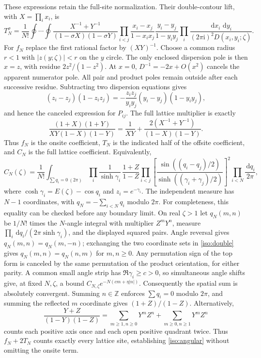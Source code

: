 \documentclass[11pt]{article}
\numberwithin{equation}{section}
\theoremstyle{definition}
\newcommand{\Z}{\mathbb Z}
\newcommand{\ii}{\mathrm i}
\newcommand{\dd}{\,\mathrm d}
\begin{document}
These expressions retain the full-site normalization. Their double-contour
lift, with $X=\prod_i x_i$, is
\begin{equation}
 T_N^\sigma=\frac1{N!}\oint\cdots\oint
 \frac{X^{-1}+Y^{-1}}{(1-\sigma X)(1-\sigma Y)}
 \prod_{i<j}\frac{x_i-x_j}{1-x_ix_j}
             \frac{y_i-y_j}{1-y_iy_j}
 \prod_i\frac{\dd x_i\,\dd y_i}{(2\pi\ii)^2D(x_i,y_i;\zeta)}.
 \label{iso:double}
\end{equation}
For $f_N$ replace the first rational factor by $(XY)^{-1}$. Choose a
common radius $r<1$ with $|z(y;\zeta)|<r$ on the $y$ circle. The only
enclosed dispersion pole is then $x=z$, with residue
$2z^2/(1-z^2)$. At $x=0$, $D^{-1}=-2x+O(x^2)$ cancels the
apparent numerator pole. All pair and product poles remain outside after
each successive residue. Subtracting two dispersion equations gives
\[
 (z_i-z_j)(1-z_i z_j)
 =-\frac{z_i z_j}{y_i y_j}(y_i-y_j)(1-y_i y_j),
\]
and hence the canceled expression for $P_{ij}$. The full lattice
multiplier is exactly
\begin{equation}
 \frac{(1+X)(1+Y)}{XY(1-X)(1-Y)}
 =\frac1{XY}+\frac{2(X^{-1}+Y^{-1})}{(1-X)(1-Y)}.
 \label{iso:sites}
\end{equation}
Thus $f_N$ is the onsite coefficient, $T_N$ is the indicated half of the
offsite coefficient, and $C_N$ is the full lattice coefficient. Equivalently,
\begin{equation}
 C_N(\zeta)=\frac1{N!}\int_{\sum q_i=0\ (2\pi)}
 \prod_i\frac1{\sinh\gamma_i}\,
 \frac{1+Z}{1-Z}
 \prod_{i<j}\left[
 \frac{\sin((q_i-q_j)/2)}{\sinh((\gamma_i+\gamma_j)/2)}
 \right]^2\prod_{i<N}\frac{\dd q_i}{2\pi},
 \label{iso:angular}
\end{equation}
where $\cosh\gamma_i=E(\zeta)-\cos q_i$ and $z_i=e^{-\gamma_i}$.
The independent measure has $N-1$ coordinates, with
$q_N=-\sum_{i<N}q_i$ modulo $2\pi$.
For completeness, this equality can be checked before any boundary limit.
On real $\zeta>1$ let $q_N(m,n)$ be $1/N!$ times the $N$-angle integral with
multiplier $Z^mY^n$, measure
$\prod_i\dd q_i/(2\pi\sinh\gamma_i)$, and the displayed squared pairs.
Angle reversal gives $q_N(m,n)=q_N(m,-n)$; exchanging the two coordinate
sets in \eqref{iso:double} gives $q_N(m,n)=q_N(n,m)$ for $m,n\ge0$.
Any permutation sign of the top form is canceled by the same permutation
of the product orientation, for either parity. A common small angle
strip has $\Re\gamma_i\ge c>0$, so simultaneous angle shifts give, at
fixed $N,\zeta$, a bound $C_{N,\zeta}e^{-N(cm+\eta|n|)}$.
Consequently the spatial sum is absolutely convergent. Summing $n\in\Z$
enforces $\sum q_i=0$ modulo $2\pi$, and summing the reflected $m$
coordinate gives $(1+Z)/(1-Z)$. Alternatively,
\[
 \frac{Y+Z}{(1-Y)(1-Z)}
 =\sum_{m\ge1,n\ge0}Y^mZ^n+
  \sum_{m\ge0,n\ge1}Y^mZ^n
\]
counts each positive axis once and each open positive quadrant twice.
Thus $f_N+2T_N$ counts exactly every lattice site, establishing
\eqref{iso:angular} without omitting the onsite term.
\end{document}
